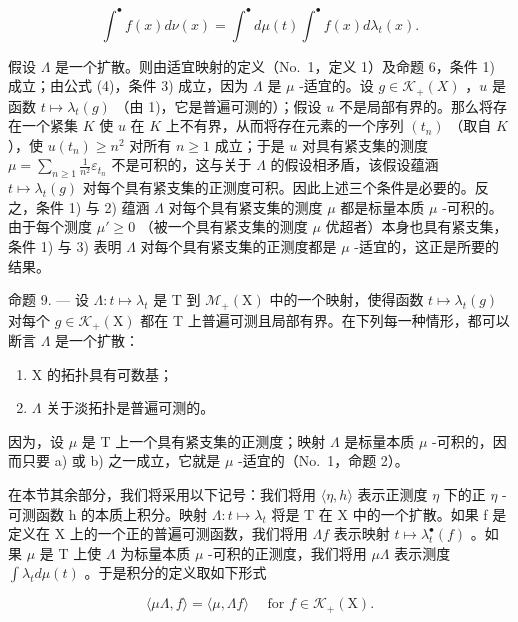 \[
\int^ {\bullet} f (x) d \nu (x) = \int^ {\bullet} d \mu (t) \int^ {\bullet} f (x) d \lambda_ {t} (x).\tag{12}
\]

假设 \(\Lambda\) 是一个扩散。则由适宜映射的定义（No.~1，定义 1）及命题 6，条件 1) 成立；由公式 (4)，条件 3) 成立，因为 \(\Lambda\) 是 \(\mu\) -适宜的。设 \(g \in \mathcal{K}_{+}(X)\) ，\(u\) 是函数 \(t \mapsto \lambda_t(g)\) （由 1)，它是普遍可测的）；假设 \(u\) 不是局部有界的。那么将存在一个紧集 \(K\) 使 \(u\) 在 \(K\) 上不有界，从而将存在元素的一个序列 \((t_n)\) （取自 \(K\) ），使 \(u(t_n) \geqslant n^2\) 对所有 \(n \geqslant 1\) 成立；于是 \(u\) 对具有紧支集的测度 \(\mu = \sum_{n \geqslant 1} \frac{1}{n^2} \varepsilon_{t_n}\) 不是可积的，这与关于 \(\Lambda\) 的假设相矛盾，该假设蕴涵 \(t \mapsto \lambda_t(g)\) 对每个具有紧支集的正测度可积。因此上述三个条件是必要的。反之，条件 1) 与 2) 蕴涵 \(\Lambda\) 对每个具有紧支集的测度 \(\mu\) 都是标量本质 \(\mu\) -可积的。由于每个测度 \(\mu' \geqslant 0\) （被一个具有紧支集的测度 \(\mu\) 优超者）本身也具有紧支集，条件 1) 与 3) 表明 \(\Lambda\) 对每个具有紧支集的正测度都是 \(\mu\) -适宜的，这正是所要的结果。

命题 9. --- 设 \(\Lambda : t \mapsto \lambda_t\) 是 T 到 \(\mathcal{M}_+(\mathrm{X})\) 中的一个映射，使得函数 \(t \mapsto \lambda_t(g)\) 对每个 \(g \in \mathcal{K}_+(\mathrm{X})\) 都在 T 上普遍可测且局部有界。在下列每一种情形，都可以断言 \(\Lambda\) 是一个扩散：

\begin{enumerate}
\def\labelenumi{\alph{enumi})}
\item
  X 的拓扑具有可数基；
\item
  \(\Lambda\) 关于淡拓扑是普遍可测的。
\end{enumerate}

因为，设 \(\mu\) 是 T 上一个具有紧支集的正测度；映射 \(\Lambda\) 是标量本质 \(\mu\) -可积的，因而只要 a) 或 b) 之一成立，它就是 \(\mu\) -适宜的（No.~1，命题 2）。

在本节其余部分，我们将采用以下记号：我们将用 \(\langle\eta,h\rangle\) 表示正测度 \(\eta\) 下的正 \(\eta\) -可测函数 h 的本质上积分。映射 \(\Lambda:t\mapsto\lambda_{t}\) 将是 T 在 X 中的一个扩散。如果 f 是定义在 X 上的一个正的普遍可测函数，我们将用 \(\Lambda f\) 表示映射 \(t\mapsto\lambda_{t}^{\bullet}(f)\) 。如果 \(\mu\) 是 T 上使 \(\Lambda\) 为标量本质 \(\mu\) -可积的正测度，我们将用 \(\mu\Lambda\) 表示测度 \(\int\lambda_{t}d\mu(t)\) 。于是积分的定义取如下形式

\[
\langle \mu \Lambda , f \rangle = \langle \mu , \Lambda f \rangle \quad \text { for } f \in \mathscr {K} _ {+} (\mathrm{X}).
\]

